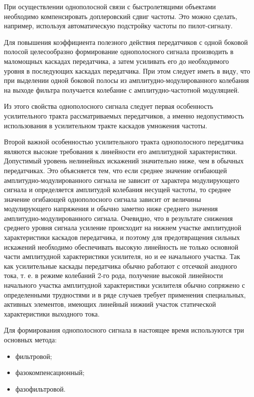 При осуществлении однополосной связи с быстролетящими объектами необходимо компенсировать доплеровский сдвиг частоты. Это можно сделать, например, используя автоматическую подстройку частоты по пилот-сигналу.

Для повышения коэффициента полезного действия передатчиков с одной боковой полосой целесообразно формирование однополосного сигнала производить в маломощных каскадах передатчика, а затем усиливать его до необходимого уровня в последующих каскадах передатчика. При этом следует иметь в виду, что при выделении одной боковой полосы из амплитудно-модулированного колебания на выходе фильтра получается колебание с
амплитудно-частотной модуляцией.

Из этого свойства однополосного сигнала следует первая особенность усилительного тракта рассматриваемых передатчиков, а именно недопустимость использования в усилительном тракте каскадов умножения частоты.

Второй важной особенностью усилительного тракта однополосного передатчика являются высокие требования к линейности его амплитудной характеристики. Допустимый уровень нелинейных искажений значительно ниже, чем в обычных передатчиках. Это объясняется тем, что если среднее значение огибающей амплитудно-модулированного сигнала не зависит от характера модулирующего сигнала и определяется амплитудой колебания несущей частоты, то среднее значение огибающей однополосного сигнала зависит от величины модулирующего напряжения и обычно заметно ниже среднего значения амплитудно-модулированного сигнала. Очевидно, что в результате снижения среднего уровня сигнала усиление происходит на нижнем
участке амплитудной характеристики каскадов передатчика, и поэтому для предотвращения сильных искажений необходимо обеспечивать высокую линейность не только основной части амплитудной характеристики усилителя, но и ее начального участка. Так как усилительные каскады передатчика обычно работают с отсечкой анодного тока, т. е. в режиме колебаний 2-го рода, получение высокой линейности начального участка амплитудной характеристики усилителя обычно сопряжено с определенными трудностями и в ряде случаев требует применения специальных, активных элементов, имеющих линейный нижний участок статической характеристики выходного тока. 

Для формирования однополосного сигнала в настоящее время
используются три основных метода: 
\begin{itemize}
	\item фильтровой;
	\item фазокомпенсационный;
	\item фазофильтровой.
\end{itemize} 

